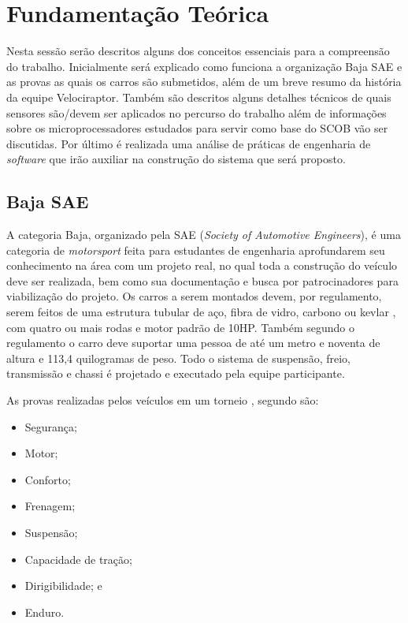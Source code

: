 \chapter{Fundamentação Teórica}
	\label{ch:fundamentacao}
Nesta sessão serão descritos alguns dos conceitos essenciais para a compreensão do trabalho. Inicialmente será explicado como funciona a organização Baja SAE e as provas as quais os carros são submetidos, além de um breve resumo da história da equipe Velociraptor. Também são descritos alguns detalhes técnicos de quais sensores são/devem ser aplicados no percurso do trabalho além de informações sobre os microprocessadores estudados para servir como base do SCOB vão ser discutidas. Por último é realizada uma análise de práticas de engenharia de \textit{software} que irão auxiliar na construção do sistema que será proposto.

\section{Baja SAE}
A categoria Baja, organizado pela SAE (\textit{Society of Automotive Engineers}), é uma categoria de \textit{motorsport} feita para estudantes de engenharia aprofundarem seu conhecimento na área com um projeto real, no qual toda a construção do veículo deve ser realizada, bem como sua documentação e busca por patrocinadores para viabilização do projeto. Os carros a serem montados devem, por regulamento, \cite{regulamentobajasae} serem feitos de uma estrutura tubular de aço, fibra de vidro, carbono ou kevlar \cite{projetoMiniBaja2006}, com quatro ou mais rodas e motor padrão de 10HP. Também segundo o regulamento o carro deve suportar uma pessoa de até um metro e noventa de altura e 113,4 quilogramas de peso. Todo o sistema de suspensão, freio, transmissão e chassi é projetado e executado pela equipe participante.  

As provas realizadas pelos veículos em um torneio , segundo \cite{bajasae} são:
\begin{itemize}
	\item Segurança;
	\item Motor;
	\item Conforto;
	\item Frenagem;
	\item Suspensão;
	\item Capacidade de tração;
	\item Dirigibilidade; e
	\item Enduro.
\end{itemize}

